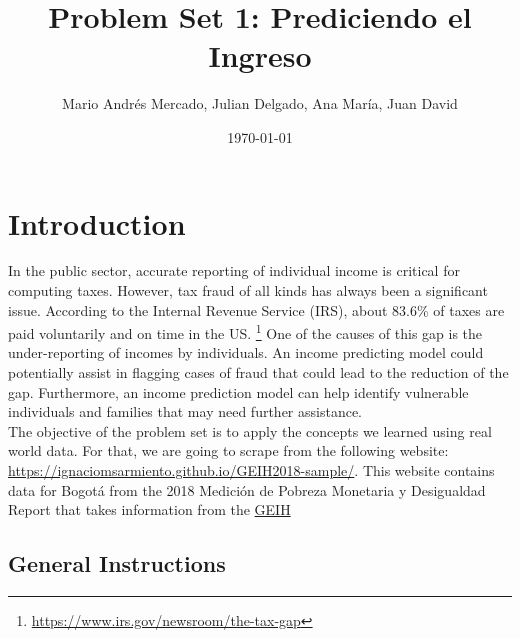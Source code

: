 \documentclass[12pt,a4paper,onecolumn]{article}
\title{Problem Set 1: Prediciendo el Ingreso}
\author{Mario Andr\'es Mercado, Julian Delgado, Ana Mar\'ia, Juan David}
\date{\today}
\begin{document}
\maketitle

\thispagestyle{empty} %










\medskip



\pagebreak
\doublespacing





\section{Introduction} \label{sec:intro}

In the public sector, accurate reporting of individual income is critical for computing taxes.
However, tax fraud of all kinds has always been a significant issue. According to the Internal
Revenue Service (IRS), about 83.6\% of taxes are paid voluntarily and on time in the US. \footnote{\url{https://www.irs.gov/newsroom/the-tax-gap}} One of the causes of this gap is the under-reporting of incomes by individuals. An income
predicting model could potentially assist in flagging cases of fraud that could lead to the
reduction of the gap. Furthermore, an income prediction model can help identify vulnerable
individuals and families that may need further assistance.\\
The objective of the problem set is to apply the concepts we learned using real world
data. For that, we are going to scrape from the following website: \url {https://ignaciomsarmiento.github.io/GEIH2018-sample/}. This website contains data for Bogot\'a from the 2018 Medici\'on de Pobreza Monetaria y Desigualdad Report that takes information from the \href{https://www.dane.gov.co/index.php/estadisticas-por-tema/mercado-laboral/empleo-y-desempleo/geih-historicos}{GEIH}

\subsection{General Instructions}
\end{document}
